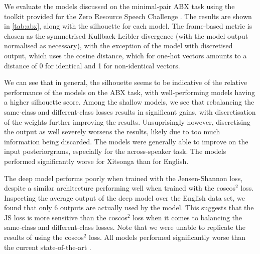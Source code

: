 We evaluate the models discussed on the minimal-pair ABX task \parencite{schatz2013evaluating} using the toolkit provided for the Zero Resource Speech Challenge \parencite{versteegh2015zero}.
The results are shown in \cref{tab:abx}, along with the silhouette for each model.
The frame-based metric is chosen as the symmetrised Kullback-Leibler divergence (with the model output normalised as necessary), with the exception of the model with discretised output, which uses the cosine distance, which for one-hot vectors amounts to a distance of 0 for identical and 1 for non-identical vectors.

We can see that in general, the silhouette seems to be indicative of the relative performance of the models on the ABX task, with well-performing models having a higher silhouette score.
Among the shallow models, we see that rebalancing the same-class and different-class losses results in significant gains, with discretisation of the weights further improving the results.
Unsuprisingly however, discretising the output as well severely worsens the results, likely due to too much information being discarded.
The models were generally able to improve on the input posteriorgrams, especially for the across-speaker task.
The models performed significantly worse for Xitsonga than for English.

The deep model performs poorly when trained with the Jensen-Shannon loss, despite a similar architecture performing well when trained with the coscos$^2$ loss.
Inspecting the average output of the deep model over the English data set, we found that only 6 outputs are actually used by the model.
This suggests that the JS loss is more sensitive than the coscos$^2$ loss when it comes to balancing the same-class and different-class losses. 
Note that we were unable to replicate the results of \textcite{thiolliere2015hybrid} using the coscos$^2$ loss.
All models performed significantly worse than the current state-of-the-art \parencite{heck2016unsupervised}.



